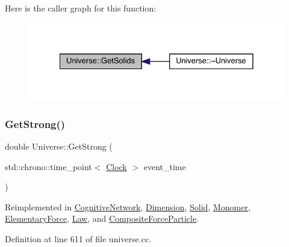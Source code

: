 Here is the caller graph for this function\+:
\nopagebreak
\begin{figure}[H]
\begin{center}
\leavevmode
\includegraphics[width=328pt]{class_universe_a669fc068dd7820a5af309bfbe67199aa_icgraph}
\end{center}
\end{figure}
\mbox{\label{class_universe_acb453ce71da418c5b5617fecede9571b}} 
\subsubsection{\texorpdfstring{Get\+Strong()}{GetStrong()}}
{\footnotesize\ttfamily double Universe\+::\+Get\+Strong (\begin{DoxyParamCaption}\item[{std\+::chrono\+::time\+\_\+point$<$ \hyperlink{universe_8h_a0ef8d951d1ca5ab3cfaf7ab4c7a6fd80}{Clock} $>$}]{event\+\_\+time }\end{DoxyParamCaption})\hspace{0.3cm}{\ttfamily [virtual]}}



Reimplemented in \hyperlink{class_cognitive_network_a277247686f8af159e7a7beb0ec379225}{Cognitive\+Network}, \hyperlink{class_dimension_ae36aadad4ae84735a5ff73bff4eb97b1}{Dimension}, \hyperlink{class_solid_ae39d0166456b8feaa39547e5a21c9096}{Solid}, \hyperlink{class_monomer_aa35033340e88c46757d1d5ccba21a21e}{Monomer}, \hyperlink{class_elementary_force_aaa1cde27b1508831f67353eb39745a7e}{Elementary\+Force}, \hyperlink{class_law_afd94bf09dbaf5d5df36b8f093db02dd9}{Law}, and \hyperlink{class_composite_force_particle_a9818d469c9841eaf77fbe329b0953354}{Composite\+Force\+Particle}.



Definition at line 611 of file universe.\+cc.

